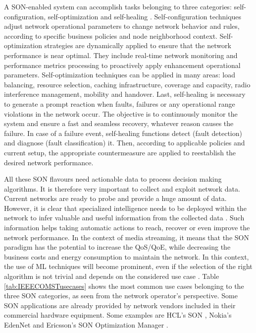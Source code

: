 A SON-enabled system can accomplish tasks belonging to three categories: self-configuration, self-optimization and self-healing \cite{Aliu2012}.
Self-configuration techniques adjust network operational parameters to change network behavior and rules, according to specific business policies and node neighborhood context.
Self-optimization strategies are dynamically applied to ensure that the network performance is near optimal. They include real-time network monitoring and performance metrics processing to proactively apply enhancement operational parameters. Self-optimization techniques can be applied in many areas: load balancing, resource selection, caching infrastructure, coverage and capacity, radio interference management, mobility and handover.
Last, self-healing is necessary to generate a prompt reaction when faults, failures or any operational range violations in the network occur. The objective is to continuously monitor the system and ensure a fast and seamless recovery, whatever reason causes the failure. In case of a failure event, self-healing functions detect (fault detection) and diagnose (fault classification) it. Then, according to applicable policies and current setup, the appropriate countermeasure are applied to reestablish the desired network performance.

All these SON flavours need actionable data to process decision making algorithms. It is therefore very important to collect and exploit network data. Current networks are ready to probe and provide a huge amount of data. However, it is clear that specialized intelligence needs to be deployed within the network to infer valuable and useful information from the collected data \cite{Imran2014}. Such information helps taking automatic actions to reach, recover or even improve the network performance. In the context of media streaming, it means that the SON paradigm has the potential to increase the QoS/QoE, while decreasing the business costs and energy consumption to maintain the network. In this context, the use of ML techniques will become prominent, even if the selection of the right algorithm is not trivial and depends on the considered use case \cite{Klaine2017, Moysen2018}. Table \ref{tab:IEEECOMSTusecases} shows the most common use cases belonging to the three SON categories, as seen from the network operator's perspective. Some SON applications are already provided by network vendors included in their commercial hardware equipment. Some examples are HCL's SON \cite{HCLSON}, Nokia's EdenNet \cite{NokiaSON} and Ericsson's SON Optimization Manager \cite{EricssonSON}.

